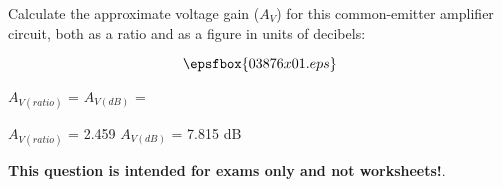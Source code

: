 

Calculate the approximate voltage gain ($A_V$) for this common-emitter amplifier circuit, both as a ratio and as a figure in units of decibels:

$$\epsfbox{03876x01.eps}$$

$A_{V(ratio)}$ = \hskip 80pt $A_{V(dB)}$ = 







$A_{V(ratio)}$ = 2.459 \hskip 50pt $A_{V(dB)}$ = 7.815 dB







{\bf This question is intended for exams only and not worksheets!}.



